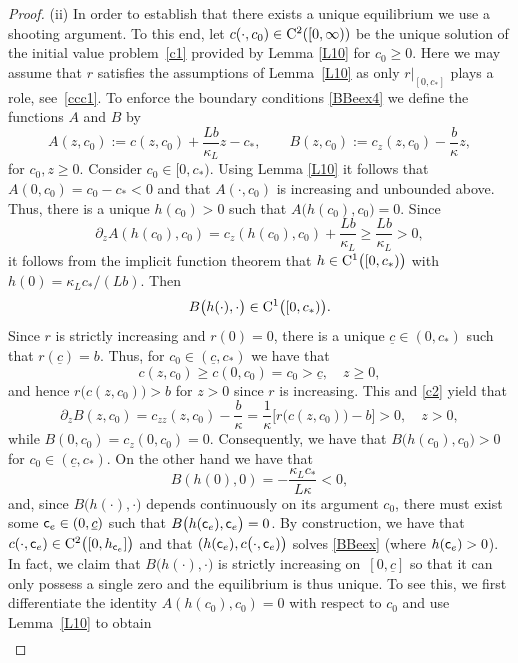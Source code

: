 \documentclass[reqno,11pt]{amsart}
\numberwithin{equation}{section}
\begin{document}
\begin{proof}
(ii) In order to establish that there exists a unique
  equilibrium we use a shooting argument. To this end, let
  $c(\cdot,c_0)\in {\rm C}^2([0,\infty))$ be the unique solution of
  the initial value problem~\eqref{c1} provided by Lemma \ref{L10} for
  $c_0\ge 0$. Here we may assume that $r$ satisfies the assumptions
  of Lemma~\ref{L10} as only $r\big |_{[0,c_*]}$ plays a role,
  see~\eqref{ccc1}.
  To enforce the boundary conditions \eqref{BBeex4} we define the
  functions $A$ and $B$ by
  $$
  A(z,c_0):=c(z,c_0)+\frac{L b}{\kappa_L}z-c_*, \qquad
  B(z,c_0):=c_z(z,c_0)-\frac{b}{\kappa}z,
  $$
  for $c_0,z\ge 0$. Consider $c_0\in [0,c_*)$. Using Lemma
  \ref{L10} it follows that $A(0,c_0)=c_0-c_*< 0$ and that
  $A(\cdot,c_0)$ is increasing and 
  unbounded above. Thus, there is a unique $h(c_0)> 0$ such that
  $A\bigl(h(c_0), c_0\bigr)=0$. Since 
$$
\partial_z A(h(c_0), c_0)= c_z(h(c_0),c_0)+\frac{L b}{\kappa_L}\ge
\frac{L b}{\kappa_L}>0, 
$$ 
it follows from the implicit function theorem that
$h\in{\rm C}^1\bigl([0,c_*)\bigr)$ with $h(0)=\kappa_L
c_*/(Lb)$.
Then 
  $$
  B\bigl( h(\cdot),\cdot\bigr)\in{\rm C}^1\bigl([0,c_*)\bigr).
  $$
  Since $r$ is strictly increasing and $r(0)=0$, there is a unique
  $\underline{c}\in (0,c_*)$ such that $r(\underline{c})=b$. Thus, for
  $c_0\in (\underline{c},c_*)$ we have that
  $$
  c(z,c_0)\geq c(0,c_0)=c_0>\underline{c},\quad z\geq 0,
  $$
  and hence $r\bigl( c(z,c_0)\bigr)>b$ for $z>0$ since
  $r$ is increasing. This and \eqref{c2} yield that
  $$
  \partial_z
  B(z,c_0)=c_{zz}(z,c_0)-\frac{b}{\kappa}=\frac{1}{\kappa}
  \big[r\bigl(c(z,c_0)\bigr)-b\big]>0,\quad z>0,
  $$
  while $B(0,c_0)=c_z(0,c_0)=0$. Consequently, we have that $B\bigl(
  h(c_0),c_0\bigr)>0$ for $c_0\in (\underline{c},c_*)$. On the other
  hand we have that
  $$
  B(h(0),0)=-\frac{\kappa_L c_*}{L\kappa}<0,
  $$
  and, since $B\bigl( h(\cdot),\cdot\bigr)$ depends continuously on
  its argument $c_0$, there must exist some ${\sf c}_e\in (0,\underline{c})$
  such that $B\bigl (h({\sf c}_e),{\sf c}_e\bigr)=0$. By construction, we have
  that $c(\cdot,{\sf c}_e)\in{\rm C}^2\bigl([0,h_{{\sf c}_e}]\bigr)$
  and that $(h({\sf c}_e),c\bigl( \cdot,{\sf c}_e)\bigr)$
  solves \eqref{BBeex} (where $h({\sf c}_e)>0$). In fact, we claim that
  $B\bigl( h(\cdot),\cdot\bigr)$ is strictly increasing
  on~$[0,\underline{c}]$ so that it can only possess a single zero and 
  the equilibrium is thus unique. To see this, we first differentiate
  the identity $A(h(c_0),c_0)=0$ with respect to $c_0$ and use
  Lemma~\ref{L10} to obtain 
\begin{align}\label{i1}

\end{align}
\end{proof}
\end{document}
